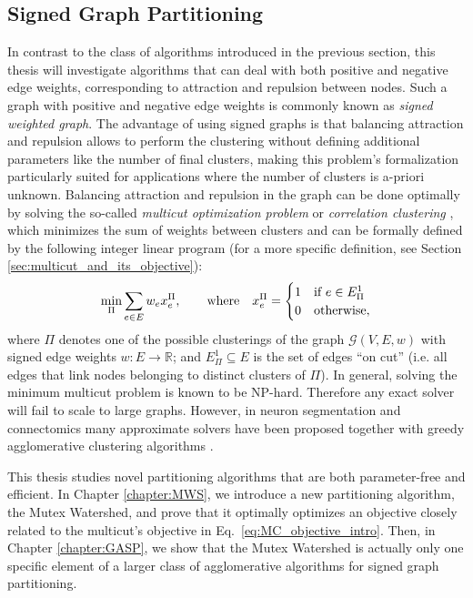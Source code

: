 \subsection{Signed Graph Partitioning}
In contrast to the class of algorithms introduced in the previous section, this thesis will investigate algorithms that can
deal with both positive and negative edge weights, corresponding to attraction and repulsion between nodes. Such a graph with positive and negative edge weights is commonly known as \emph{signed weighted graph}. The advantage of using signed graphs is that balancing attraction and repulsion allows to perform the clustering without defining additional parameters like the number of final clusters, making this problem's formalization particularly suited for applications where the number of clusters is a-priori unknown. Balancing attraction and repulsion in the graph can be done optimally by solving the so-called \emph{multicut optimization problem} or \emph{correlation clustering} \cite{kappes2011globally,chopra1991multiway}, which minimizes the sum of weights between clusters and can be formally defined by the following integer linear program (for a more specific definition, see Section \ref{sec:multicut_and_its_objective}):
\begin{equation}\label{eq:MC_objective_intro}
 \min_\Pi \sum_{e\in E} w_e x_e^\Pi,  \qquad \text{where} \quad x^\Pi_e = 
 \begin{cases} 
 1 & \text{if } e\in E^1_\Pi \\
 0 & \text{otherwise},
 \end{cases}
\end{equation}
where $\Pi$ denotes one of the possible clusterings of the graph $\mathcal{G}(V,E,w)$ with signed edge weights $w:E\rightarrow \mathbb{R}$; and $E_\Pi^1 \subseteq E$ is the set of edges ``on cut'' (i.e. all edges that link nodes belonging to distinct clusters of $\Pi$). 
In general, solving the minimum multicut problem is known to be NP-hard. Therefore any exact solver will fail to scale to large graphs. However, in neuron segmentation and connectomics many approximate solvers have been proposed \cite{lange2018combinatorial,pape2017solving,beier2016efficient,yarkony2012fast} together with greedy agglomerative clustering algorithms \cite{keuper2015efficient,levinkov2017comparative,kardoostsolving}. 

This thesis studies novel partitioning algorithms that are both parameter-free and efficient. In Chapter \ref{chapter:MWS}, we introduce a new partitioning algorithm, the Mutex Watershed, and prove that it optimally optimizes an objective closely related to the multicut's objective in Eq.~\ref{eq:MC_objective_intro}. Then, in Chapter \ref{chapter:GASP}, we show that the Mutex Watershed is actually only one specific element of a larger class of agglomerative algorithms for signed graph partitioning.




